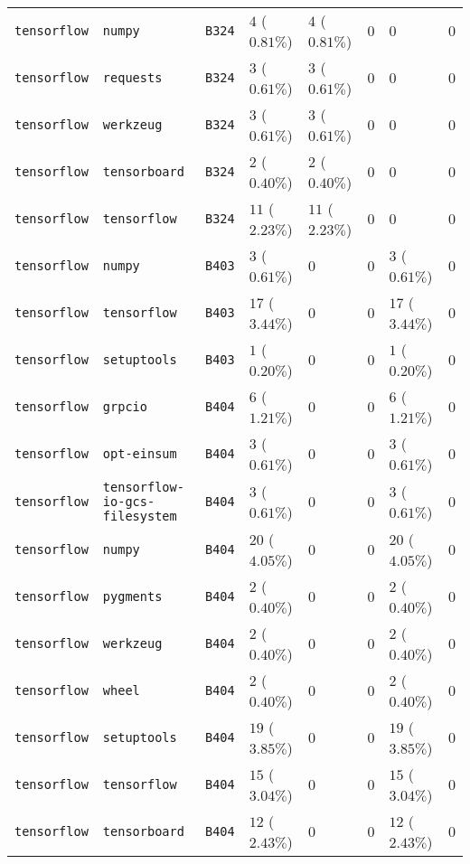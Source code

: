 \begin{table}
\begin{tabular}{llllllll}
\texttt{tensorflow} & \texttt{numpy} & \texttt{B324} & $4$ ($0.81\%$) & $4$ ($0.81\%$) & $0$ & $0$ & $0$ \\
\texttt{tensorflow} & \texttt{requests} & \texttt{B324} & $3$ ($0.61\%$) & $3$ ($0.61\%$) & $0$ & $0$ & $0$ \\
\texttt{tensorflow} & \texttt{werkzeug} & \texttt{B324} & $3$ ($0.61\%$) & $3$ ($0.61\%$) & $0$ & $0$ & $0$ \\
\texttt{tensorflow} & \texttt{tensorboard} & \texttt{B324} & $2$ ($0.40\%$) & $2$ ($0.40\%$) & $0$ & $0$ & $0$ \\
\texttt{tensorflow} & \texttt{tensorflow} & \texttt{B324} & $11$ ($2.23\%$) & $11$ ($2.23\%$) & $0$ & $0$ & $0$ \\
\texttt{tensorflow} & \texttt{numpy} & \texttt{B403} & $3$ ($0.61\%$) & $0$ & $0$ & $3$ ($0.61\%$) & $0$ \\
\texttt{tensorflow} & \texttt{tensorflow} & \texttt{B403} & $17$ ($3.44\%$) & $0$ & $0$ & $17$ ($3.44\%$) & $0$ \\
\texttt{tensorflow} & \texttt{setuptools} & \texttt{B403} & $1$ ($0.20\%$) & $0$ & $0$ & $1$ ($0.20\%$) & $0$ \\
\texttt{tensorflow} & \texttt{grpcio} & \texttt{B404} & $6$ ($1.21\%$) & $0$ & $0$ & $6$ ($1.21\%$) & $0$ \\
\texttt{tensorflow} & \texttt{opt-einsum} & \texttt{B404} & $3$ ($0.61\%$) & $0$ & $0$ & $3$ ($0.61\%$) & $0$ \\
\texttt{tensorflow} & \texttt{tensorflow-io-gcs-filesystem} & \texttt{B404} & $3$ ($0.61\%$) & $0$ & $0$ & $3$ ($0.61\%$) & $0$ \\
\texttt{tensorflow} & \texttt{numpy} & \texttt{B404} & $20$ ($4.05\%$) & $0$ & $0$ & $20$ ($4.05\%$) & $0$ \\
\texttt{tensorflow} & \texttt{pygments} & \texttt{B404} & $2$ ($0.40\%$) & $0$ & $0$ & $2$ ($0.40\%$) & $0$ \\
\texttt{tensorflow} & \texttt{werkzeug} & \texttt{B404} & $2$ ($0.40\%$) & $0$ & $0$ & $2$ ($0.40\%$) & $0$ \\
\texttt{tensorflow} & \texttt{wheel} & \texttt{B404} & $2$ ($0.40\%$) & $0$ & $0$ & $2$ ($0.40\%$) & $0$ \\
\texttt{tensorflow} & \texttt{setuptools} & \texttt{B404} & $19$ ($3.85\%$) & $0$ & $0$ & $19$ ($3.85\%$) & $0$ \\
\texttt{tensorflow} & \texttt{tensorflow} & \texttt{B404} & $15$ ($3.04\%$) & $0$ & $0$ & $15$ ($3.04\%$) & $0$ \\
\texttt{tensorflow} & \texttt{tensorboard} & \texttt{B404} & $12$ ($2.43\%$) & $0$ & $0$ & $12$ ($2.43\%$) & $0$ \\

\end{tabular}
\end{table}
